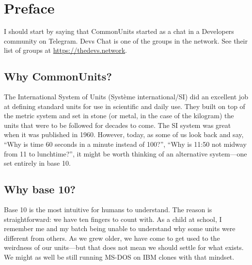 \chapter*{Preface}

I should start by saying that CommonUnits started as a chat in a Developers community on Telegram.
Devs Chat is one of the groups in the  network. See their list of groups at \url{https://thedevs.network}.

\section*{Why CommonUnits?}
The International System of Units (Système international/SI) did an excellent job at defining standard units for use in scientific and daily use. They built on top of the metric system and set in stone (or metal, in the case of the kilogram) the units that were to be followed for decades to come.
The SI system was great when it was published in 1960.
However, today, as some of us look back and say, ``Why is time 60 seconds in a minute instead of 100?'', ``Why is 11:50 not midway from 11 to lunchtime?'', it might be worth thinking of an alternative system—one set entirely in base 10.

\section*{Why base 10?}
Base 10 is the most intuitive for humans to understand. The reason is straightforward: we have ten fingers to count with. As a child at school, I remember me and my batch being unable to understand why some units were different from others. As we grew older, we have come to get used to the weirdness of our units—but that does not mean we should settle for what exists. We might as well be still running MS-DOS on IBM clones with that mindset.

